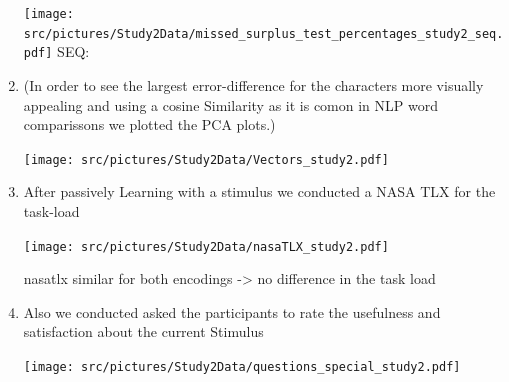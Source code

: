 \begin{enumerate}
        \centering
        \texttt{[image: src/pictures/Study2Data/missed\_surplus\_test\_percentages\_study2\_seq.pdf]}
    SEQ:
    

    \item (In order to see the largest error-difference for the characters more visually appealing and using a cosine Similarity as it is comon in NLP word comparissons we plotted the PCA plots.)

    \centering
    \texttt{[image: src/pictures/Study2Data/Vectors\_study2.pdf]}

    \item After passively Learning with a stimulus we conducted a NASA TLX for the task-load

    \centering
    \texttt{[image: src/pictures/Study2Data/nasaTLX\_study2.pdf]}


\begin{table}[ht]
\caption{Results of \gls{mwu} significance tests for the different NasaTLX dimensions with Cohens d.}
\label{table:nasaTLX_significance_secondStudy_nonParam}
\end{table}

nasatlx similar for both encodings -> no difference in the task load

        \item Also we conducted asked the participants to rate the usefulness and satisfaction about the current Stimulus

    \centering
    \texttt{[image: src/pictures/Study2Data/questions\_special\_study2.pdf]}



\end{enumerate}
